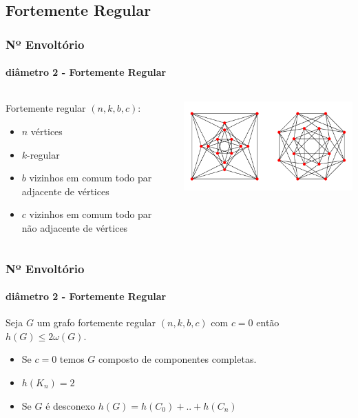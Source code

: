 \subsection{Fortemente Regular}

\begin{frame}
\frametitle{Nº Envoltório}
\framesubtitle{diâmetro 2 - Fortemente Regular}
  \begin{columns}[T]
    \begin{column}{.4\textwidth}
     Fortemente regular $(n,k,b,c)$:
     \begin{itemize}
         \item $n$ vértices
         \item $k$-regular
         \item $b$ vizinhos em comum todo par adjacente de vértices \item $c$ vizinhos em comum todo par não adjacente de vértices
     \end{itemize}
    \end{column}
    \begin{column}{.6\textwidth}
        \centering
        \includegraphics[scale=0.6]{img/sr.png}
    \end{column}
  \end{columns}
\end{frame}

\begin{frame}
\frametitle{Nº Envoltório}
\framesubtitle{diâmetro 2 - Fortemente Regular}

\begin{theo}
Seja $G$ um grafo fortemente regular $(n,k,b,c)$ com $c=0$ então $h(G)\le 2\omega(G)$.
\end{theo}

\begin{itemize}
    \item Se $c=0$ temos $G$ composto de componentes completas.
    \item $h(K_n)=2$ 
    \item Se $G$ é desconexo $h(G)=h(C_0)+..+h(C_n)$
\end{itemize}
\end{frame}

